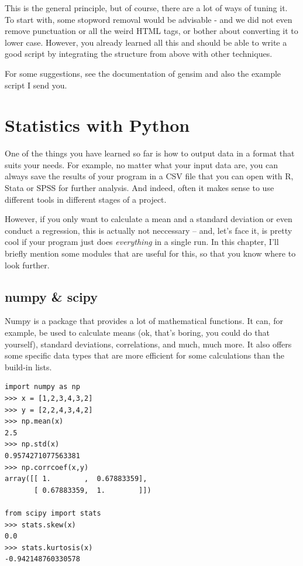 \documentclass[a4paper,12pt]{book}
\begin{document}
This is the general principle, but of course, there are a lot of ways of tuning it. To start with, some stopword removal would be advisable - and we did not even remove punctuation or all the weird HTML tags, or bother about converting it to lower case. However, you already learned all this and should be able to write a good script by integrating the structure from above with other techniques.

For some suggestions, see the documentation of gensim and also the example script I send you.

\chapter{Statistics with Python}
One of the things you have learned so far is how to output data in a format that suits your needs. For example, no matter what your input data are, you can always save the results of your program in a CSV file that you can open with R, Stata or SPSS for further analysis. And indeed, often it makes sense to use different tools in different stages of a project.

However, if you only want to calculate a mean and a standard deviation or even conduct a regression, this is actually not neccessary -- and, let's face it, is pretty cool if your program just does \emph{everything} in a single run. In this chapter, I'll briefly mention some modules that are useful for this, so that you know where to look further.


\section{numpy \& scipy}
Numpy is a package that provides a lot of mathematical functions. It can, for example, be used to calculate means (ok, that's boring, you could do that yourself), standard deviations, correlations, and much, much more. It also offers some specific data types that are more efficient for some calculations than the build-in lists. 


\begin{lstlisting}
import numpy as np
>>> x = [1,2,3,4,3,2]
>>> y = [2,2,4,3,4,2]
>>> np.mean(x)
2.5
>>> np.std(x)
0.9574271077563381
>>> np.corrcoef(x,y)
array([[ 1.        ,  0.67883359],
       [ 0.67883359,  1.        ]])

from scipy import stats
>>> stats.skew(x)
0.0
>>> stats.kurtosis(x)
-0.942148760330578
\end{lstlisting}
\end{document}
